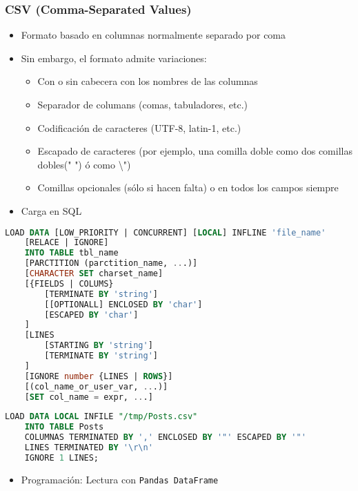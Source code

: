 \subsubsection{CSV (Comma-Separated Values)}
\begin{itemize}
\item Formato basado en columnas normalmente separado por coma
\item Sin embargo, el formato admite variaciones:
\begin{itemize}
\item Con o sin cabecera con los nombres de las columnas
\item Separador de columans (comas, tabuladores, etc.)
\item Codificación de caracteres (UTF-8, latin-1, etc.)
\item Escapado de caracteres (por ejemplo, una comilla doble como dos comillas dobles(" ") ó como \textbackslash")
\item Comillas opcionales (sólo si hacen falta) o en todos los campos siempre
\end{itemize}
\end{itemize}
\begin{itemize}[label=\color{red}\textbullet, leftmargin=*]
	\item \color{lightblue}Carga en SQL
\end{itemize}
\begin{lstlisting}[language=SQL]
LOAD DATA [LOW_PRIORITY | CONCURRENT] [LOCAL] INFLINE 'file_name'
    [RELACE | IGNORE]
    INTO TABLE tbl_name
    [PARCTITION (parctition_name, ...)]
    [CHARACTER SET charset_name]
    [{FIELDS | COLUMS}
        [TERMINATE BY 'string']
        [[OPTIONALL] ENCLOSED BY 'char']
        [ESCAPED BY 'char']
    ]
    [LINES
        [STARTING BY 'string']
        [TERMINATE BY 'string']
    ]
    [IGNORE number {LINES | ROWS}]
    [(col_name_or_user_var, ...)]
    [SET col_name = expr, ...]
\end{lstlisting}

\begin{lstlisting}[language=SQL]
LOAD DATA LOCAL INFILE "/tmp/Posts.csv"
    INTO TABLE Posts
    COLUMNAS TERMINATED BY ',' ENCLOSED BY '"' ESCAPED BY '"'
    LINES TERMINATED BY '\r\n'
    IGNORE 1 LINES;
\end{lstlisting}

\begin{itemize}[label=\color{red}\textbullet, leftmargin=*]
	\item \color{lightblue}Programación: Lectura con \texttt{Pandas DataFrame}
\end{itemize}
